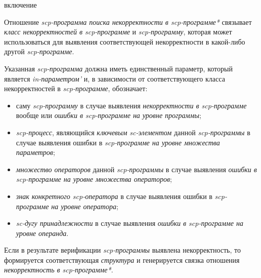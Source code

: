 \begin{SCn}
\begin{scnrelfromlist}{включение}
    \begin{scnindent}
    \end{scnindent}
\end{scnrelfromlist}

\end{SCn}

Отношение \textit{scp-программа поиска некорректности в scp-программе*} связывает \textit{класс некорректностей в scp-программе} и \textit{scp-программу}, которая может использоваться для выявления соответствующей некорректности в какой-либо другой \textit{scp-программе}. 

Указанная \textit{scp-программа} должна иметь единственный параметр, который является \textit{in-параметром’} и, в зависимости от соответствующего класса некорректностей в \textit{scp-программе}, обозначает:

\begin{itemize}
    \item саму \textit{scp-программу} в случае выявления \textit{некорректности в \mbox{scp-программе}} вообще или \textit{ошибки в scp-программе на уровне программы};
    \item \textit{scp-процесс}, являющийся \textit{ключевым sc-элементом} данной \textit{\mbox{scp-программы}} в случае выявления ошибки в \textit{scp-программе на уровне множества параметров};
    \item \textit{множество операторов} данной \textit{\mbox{scp-программы}} в случае выявления \textit{ошибки в scp-программе на уровне множества операторов};
    \item \textit{знак конкретного scp-оператора} в случае выявления ошибки в \textit{\mbox{scp-программе} на уровне оператора};
    \item \textit{sc-дугу принадлежности} в случае выявления \textit{ошибки в scp-программе на уровне операнда}.
\end{itemize}

Если в результате верификации \textit{scp-программы} выявлена некорректность, то формируется соответствующая \textit{структура} и генерируется связка отношения \textit{некорректность в scp-программе*}.

